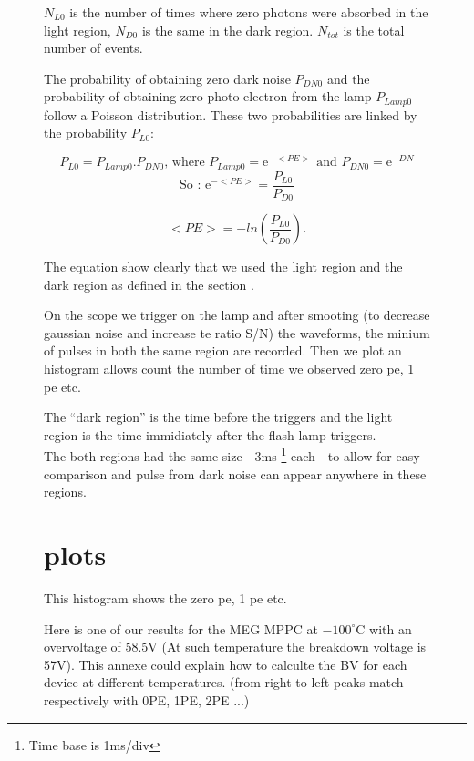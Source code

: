 \begin{figure}[!hbtp]
  \(N_{L0}\) is the number of times where zero photons were absorbed in the light region, \(N_{D0}\) is the same in the dark region. 
  \(N_{tot}\) is the total number of events. 
  
  The probability of obtaining zero dark noise \(P_{DN0}\) and the probability of obtaining zero photo electron from the lamp \(P_{Lamp0}\)
  follow a Poisson distribution. These two probabilities are linked by the probability \(P_{L0}\): 
  
  \begin{equation}
    P_{L0} = P_{Lamp0}.P_{DN0} \textrm{, where } P_{Lamp0} = \mathrm{e}^{-<PE>} \textrm{ and } P_{DN0} = \mathrm{e}^{-DN}
  \end{equation}
  \begin{equation}
    \textrm{So : } \mathrm{e}^{-<PE>} =\frac{P_{L0}}{P_{D0}}
  \end{equation}
  
  \begin{equation}
    <PE> =  -ln(\frac{P_{L0}}{P_{D0}}).
  \end{equation}
  
  The equation show clearly that we used the light region and the dark region as defined in the section . 
  
  On the scope we trigger on the lamp and after smooting (to decrease gaussian noise and increase te ratio S/N) the waveforms, the minium 
  of pulses in both the same region are recorded. Then we plot an histogram allows count the number of time we observed zero pe, 1 pe etc. 
    
  The ``dark region'' is the time before the \xfl triggers 
  and the light region is the time immidiately after the flash lamp triggers. 
  \\
  The both regions had the same size - 3ms \footnote{Time base is 1ms/div} each - to allow for easy comparison and pulse from 
  dark noise  can appear anywhere in these regions. 
  
  \section{plots}
  
  This histogram shows the zero pe, 1 pe etc. 
  
  Here is one of our results for the MEG MPPC at $-100^\circ$C with an overvoltage of 58.5V (At such temperature the breakdown voltage 
  is 57V). This annexe could explain how to calculte the BV for each device at different temperatures. 
  (from right to left peaks match respectively with 0PE, 1PE, 2PE ...)  
  

\end{figure}
